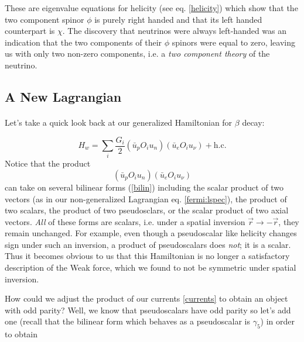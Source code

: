 \documentclass[a4paper,12pt]{book}
\begin{document}
These are eigenvalue equations for helicity (see eq. \ref{helicity}) which show that the two component spinor $\phi$ is purely right handed and that its left handed counterpart is $\chi$. The discovery that neutrinos were always left-handed was an indication that the two components of their $\phi$ spinors were equal to zero, leaving us with only two non-zero components, i.e. a \emph{two component theory} of the neutrino\cite{commins}.

\subsection{A New Lagrangian}\label{anl}

\paragraph{}Let's take a quick look back at our generalized Hamiltonian for $\beta$ decay:

\begin{equation}
 H_{w}=\displaystyle\sum_{i}\frac{G_{i}}{2}\left(\bar{u}_{p}O_{i}u_{n}\right)\left(\bar{u}_{e}O_{i}u_{\nu}\right)+\text{h.c.}
\end{equation}
Notice that the product
\begin{equation}\label{currents}
\left(\bar{u}_{p}O_{i}u_{n}\right)\left(\bar{u}_{e}O_{i}u_{\nu}\right)
\end{equation}
can take on several bilinear forms (\ref{bilin}) including the scalar product of two vectors (as in our non-generalized Lagrangian eq. \ref{fermi:lspec}), the product of two scalars, the product of two pseudosclars, or the scalar product of two axial vectors. \emph{All} of these forms are scalars, i.e. under a spatial inversion $\vec{r}\rightarrow -\vec{r}$, they remain unchanged. For example, even though a pseudoscalar like helicity changes sign under such an inversion, a product of pseudoscalars does \emph{not}; it is a scalar. Thus it becomes obvious to us that this Hamiltonian is no longer a satisfactory description of the Weak force, which we found to not be symmetric under spatial inversion.

How could we adjust the product of our currents \ref{currents} to obtain an object with odd parity? Well, we know that pseudoscalars have odd parity so let's add one (recall that the bilinear form which behaves as a pseudoscalar is $\gamma_{5}$) in order to obtain
\end{document}
